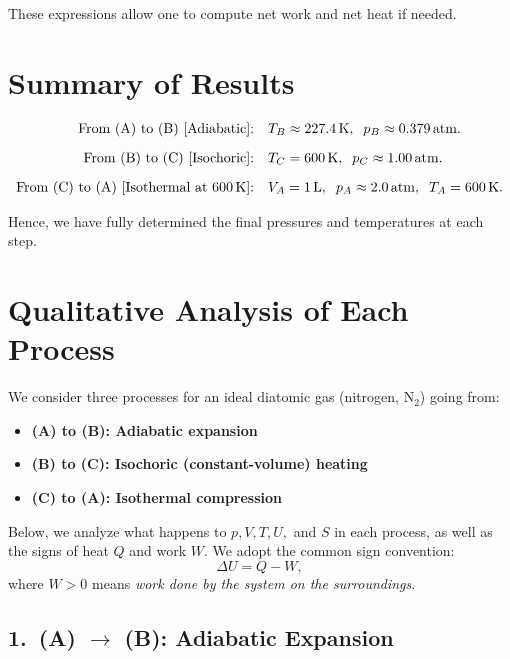 \documentclass[12pt]{article}
\theoremstyle{definition} %
\theoremstyle{plain} %
\begin{document}
\noindent
These expressions allow one to compute net work and net heat if needed.

\section*{Summary of Results}
\begin{align*}
\text{From (A) to (B) [Adiabatic]:}&\quad
T_B \approx 227.4\,\mathrm{K},\;\;
p_B \approx 0.379\,\mathrm{atm}.\\[6pt]
\text{From (B) to (C) [Isochoric]:}&\quad
T_C = 600\,\mathrm{K},\;\;
p_C \approx 1.00\,\mathrm{atm}.\\[6pt]
\text{From (C) to (A) [Isothermal at 600\,K]:}&\quad
V_A = 1\,\mathrm{L},\;\;
p_A \approx 2.0\,\mathrm{atm},\;\;
T_A = 600\,\mathrm{K}.
\end{align*}

Hence, we have fully determined the final pressures and temperatures at each step.
\section*{Qualitative Analysis of Each Process}

We consider three processes for an ideal diatomic gas (nitrogen, $\mathrm{N}_2$) going from:

\begin{itemize}
\item \textbf{(A) to (B): Adiabatic expansion}
\item \textbf{(B) to (C): Isochoric (constant-volume) heating}
\item \textbf{(C) to (A): Isothermal compression}
\end{itemize}

Below, we analyze what happens to $p, V, T, U,$ and $S$ in each process, as well as the signs of heat $Q$ and work $W$.  We adopt the common sign convention: 
\[
\Delta U = Q - W,
\]
where $W>0$ means \emph{work done by the system on the surroundings}.

\subsection*{1.\ (A) $\to$ (B): Adiabatic Expansion}
\end{document}
